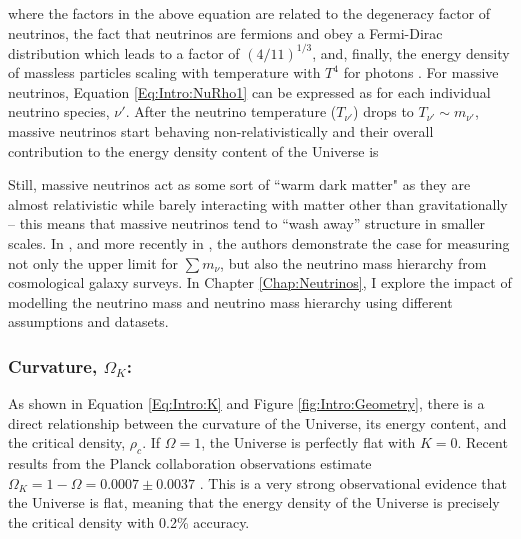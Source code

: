 where the factors in the above equation are related to the degeneracy factor of neutrinos, the fact that neutrinos are fermions and obey a Fermi-Dirac distribution which leads to a factor of $(4/11)^{1/3}$, and, finally, the energy density of massless particles scaling with temperature with $T^{4}$ for photons \citep{dods}. For massive neutrinos, Equation \eqref{Eq:Intro:NuRho1} can be expressed as 
for each individual neutrino species, $\nu'$. After the neutrino temperature ($T_{\nu'}$) drops to $T_{\nu'} \sim  m_{\nu'}$, massive neutrinos start behaving non-relativistically and their overall contribution to the energy density content of the Universe is \citep{2003HannestadNeutrino}



\qquad Still, massive neutrinos act as some sort of ``warm dark matter" as they are almost relativistic while barely interacting with matter other than gravitationally -- this means that massive neutrinos tend to ``wash away'' structure in smaller scales. In \cite{2003HannestadNeutrino}, and more recently in \cite{2016Hannestad}, the authors demonstrate the case for measuring not only the upper limit for $\sum m_{\nu}$, but also the neutrino mass hierarchy from cosmological galaxy surveys. In Chapter \ref{Chap:Neutrinos}, I explore the impact of modelling the neutrino mass and neutrino mass hierarchy using different assumptions and datasets.


\subsubsection{Curvature, $\Omega_K$:}
As shown in Equation \eqref{Eq:Intro:K} and Figure \ref{fig:Intro:Geometry}, there is a direct relationship between the curvature of the Universe, its energy content, and the critical density, $\rho_c$. If $\Omega = 1$, the Universe is perfectly flat with $K=0$. Recent results from the Planck collaboration observations estimate $\Omega_K = 1 - \Omega = 0.0007\pm 0.0037$ \citep{2018PlanckCosmology}. This is a very strong observational evidence that the Universe is flat, meaning that the energy density of the Universe is precisely the critical density with 0.2\% accuracy. 

\vspace{5mm}

